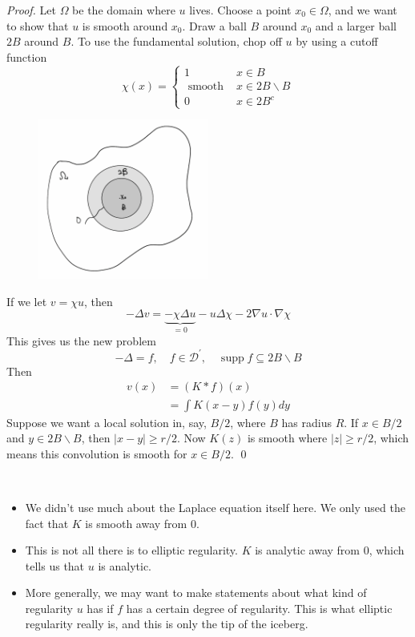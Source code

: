 \vspace{1em}
\begin{proof}
    Let $\Omega$ be the domain where $u$ lives. Choose a point $x_{0} \in \Omega$, and we want to show that $u$ is smooth around $x_{0} .$ Draw a ball $B$ around $x_{0}$ and a larger ball $2 B$ around $B$. To use the fundamental solution, chop off $u$ by using a cutoff function
    \[
        \chi(x)= \begin{cases}1 & x \in B \\ \text { smooth } & x \in 2 B \backslash B \\ 0 & x \in 2 B^{c}\end{cases}
    \]
    \begin{figure}[H]
        \centering
        \includegraphics[width=0.5\textwidth]{pics/22-1.png}
    \end{figure}
    If we let $v=\chi u$, then
$$
-\Delta v=\underbrace{-\chi \Delta u}_{=0}-u \Delta \chi-2 \nabla u \cdot \nabla \chi
$$
This gives us the new problem
$$
-\Delta=f, \quad f \in \mathcal{D}^{\prime}, \quad \operatorname{supp} f \subseteq 2 B \backslash B
$$
Then
$$
\begin{aligned}
v(x) &=(K * f)(x) \\
&=\int K(x-y) f(y) d y
\end{aligned}
$$
Suppose we want a local solution in, say, $B / 2$, where $B$ has radius $R$. If $x \in B / 2$ and $y \in 2 B \backslash B$, then $|x-y| \geq r / 2 .$ Now $K(z)$ is smooth where $|z| \geq r / 2$, which means this convolution is smooth for $x \in B / 2$.
\qed 
\end{proof}

\begin{remark}
    ~\
    \begin{itemize}
        \item We didn't use much about the Laplace equation itself here. We only used the fact that $K$ is smooth away from 0.
        \item This is not all there is to elliptic regularity. $K$ is analytic away from $0$, which tells us that $u$ is analytic.
        \item More generally, we may want to make statements about what kind of regularity $u$ has if $f$ has a certain degree of regularity. This is what elliptic regularity really is, and this is only the tip of the iceberg.
    \end{itemize}
\end{remark}

